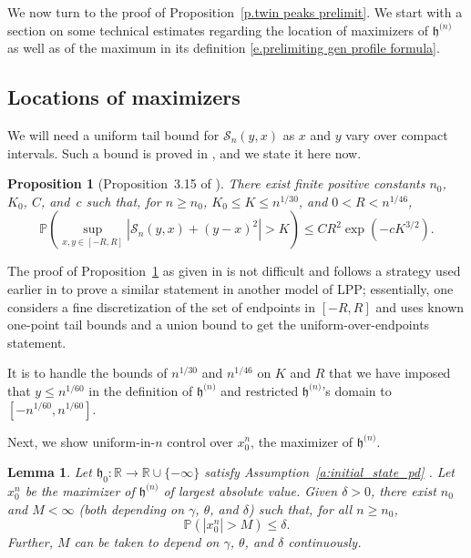 \documentclass[oneside,final,11pt]{amsart}
\newtheorem{lemma}[thm]{Lemma}
\newtheorem{proposition}[thm]{Proposition}
\theoremstyle{definition}
\newcounter{assum}
\newcommand{\fh}{\mathfrak{h}}
\newcommand{\h}{\fh^{{\scriptscriptstyle(}n{\scriptscriptstyle)}}}
\newcommand{\TP}[1]{\mathsf{TP}_{\!\!#1}}
\newcommand{\R}{\mathbb{R}}
\newcommand{\CS}{\mathcal{S}}
\renewcommand{\S}{\CS}
\newcommand{\1}[1]{\mathbf{1}_{#1}}
\newcommand{\eps}{\varepsilon}
\newcommand{\hlim}{\mathfrak{h}}
\newcommand{\mh}[1]{\marginnote{\tiny{\color{blue}[MH: #1]}}}
\newcommand{\ah}[1]{\marginnote{\tiny{\color{green!65!black}[AH: #1]}}}
\newcommand{\red}[1]{{\color{red}#1}}
\renewcommand{\P}{\mathbb P}
\numberwithin{equation}{section}
\begin{document}
We now turn to the proof of Proposition~\ref{p.twin peaks prelimit}. We start with a section on some technical estimates regarding the location of maximizers of $\h$ as well as of the maximum in its
 definition \eqref{e.prelimiting gen profile formula}.

\subsection{Locations of maximizers}\label{s.technical estimates}

 We will need a uniform tail bound for $\S_n(y, x)$ as $x$ and $y$ vary over compact intervals. Such a bound is proved in \cite{LPPtools}, and we state it here now.

\begin{proposition}[Proposition~3.15 of \cite{LPPtools}]\label{l.BrLPP uniform tail bound}
There exist finite positive constants $n_0$, $K_0$, $C$, and~$c$ such that, for $n\geq n_0$, $K_0\leq K \leq n^{1/30}$, and $0<R < n^{1/46}$,
%
$$\P\left(\sup_{x,y\in[-R,R]} \left|\S_n(y, x) + (y-x)^2\right| > K\right) \leq CR^2\exp(-cK^{3/2}).$$
\end{proposition}

The proof of Proposition~\ref{l.BrLPP uniform tail bound} as given in \cite{LPPtools} is not difficult and follows a strategy used earlier in \cite{basu2014last} to prove a similar statement in another model of LPP; essentially, one considers a fine discretization of the set of endpoints in $[-R,R]$ and uses known one-point tail bounds and a union bound to get the uniform-over-endpoints statement.

It is to handle the bounds of $n^{1/30}$ and $n^{1/46}$ on $K$ and $R$ that we have imposed that $y\leq n^{1/60}$ in the definition of $\h$ and restricted $\h$'s domain to $[-n^{1/60}, n^{1/60}]$.

Next, we show uniform-in-$n$ control over $x_0^{n}$, the maximizer of $\h$.



\begin{lemma}\label{l.tightness of prelimiting maximizer}Let $\hlim_0:\R\to\R\cup\{-\infty\}$ satisfy Assumption~\ref{a:initial_state_pd} .
Let $x_0^{n}$ be the maximizer of $\h$ of largest absolute value. Given $\delta>0$, there exist $n_0$ and $M<\infty$ (both depending on $\gamma$, $\theta$, and $\delta$) such that, for all $n\geq n_0$,
%
$$\P\left(|x_0^{n}| > M\right) \leq \delta.$$
%
Further, $M$ can be taken to depend on $\gamma$, $\theta$, and $\delta$ continuously.
\end{lemma}
\end{document}
